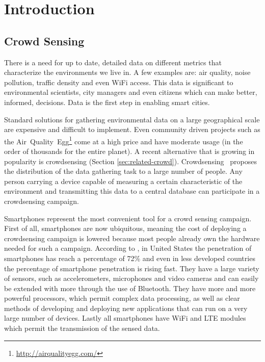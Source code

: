 \chapter{Introduction}
\label{chapter:intro}

\section{Crowd Sensing}
\label{sec:intro-crowd}
There is a need for up to date, detailed data on different metrics that characterize the environments we live in. A few examples are: air quality, noise pollution, traffic density and even WiFi access. This data is significant to environmental scientists, city managers and even citizens which can make better, informed, decisions. Data is the first step in enabling smart cities.

Standard solutions for gathering environmental data on a large geographical scale are expensive and difficult to implement. Even community driven projects such as the Air~Quality~Egg\footnote{\url{http://airqualityegg.com/}} come at a high price and have moderate usage (in the order of thousands for the entire planet). A recent alternative that is growing in popularity is crowdsensing (Section \ref{sec:related-crowd}). Crowdsensing~\cite{riva2007urbanet} proposes the distribution of the data gathering task to a large number of people. Any person carrying a device capable of measuring a certain characteristic of the environment and transmitting this data to a central database can participate in a crowdsensing campaign.

Smartphones represent the most convenient tool for a crowd sensing campaign. First of all, smartphones are now ubiquitous, meaning the cost of deploying a crowdsensing campaign is lowered because most people already own the hardware needed for such a campaign. According to \cite{poushter2016smartphone}, in United States the penetration of smartphones has reach a percentage of 72\% and even in less developed countries the percentage of smartphone penetration is rising fast. They have a large variety of sensors, such as accelerometers, microphones and video cameras and can easily be extended with more through the use of Bluetooth. They have more and more powerful processors, which permit complex data processing, as well as clear methods of developing and deploying new applications that can run on a very large number of devices. Lastly all smartphones have WiFi and LTE modules which permit the transmission of the sensed data.

